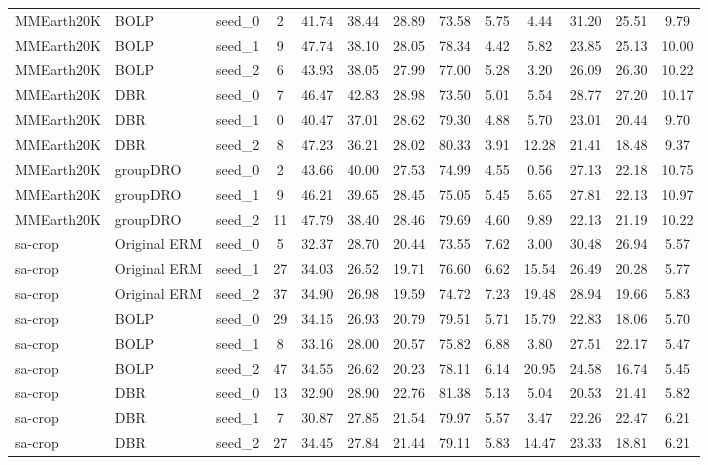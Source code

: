 \documentclass[11pt]{article}
\begin{document}
\begin{table}[h!]
{\begin{tabular}{lllcccccccccc}
MMEarth20K & BOLP & seed\_0 & 2 & 41.74 & 38.44 & 28.89 & 73.58 & 5.75 & 4.44 & 31.20 & 25.51 & 9.79 \\
MMEarth20K & BOLP & seed\_1 & 9 & 47.74 & 38.10 & 28.05 & 78.34 & 4.42 & 5.82 & 23.85 & 25.13 & 10.00 \\
MMEarth20K & BOLP & seed\_2 & 6 & 43.93 & 38.05 & 27.99 & 77.00 & 5.28 & 3.20 & 26.09 & 26.30 & 10.22 \\

MMEarth20K & DBR & seed\_0 & 7 & 46.47 & 42.83 & 28.98 & 73.50 & 5.01 & 5.54 & 28.77 & 27.20 & 10.17 \\
MMEarth20K & DBR & seed\_1 & 0 & 40.47 & 37.01 & 28.62 & 79.30 & 4.88 & 5.70 & 23.01 & 20.44 & 9.70 \\
MMEarth20K & DBR & seed\_2 & 8 & 47.23 & 36.21 & 28.02 & 80.33 & 3.91 & 12.28 & 21.41 & 18.48 & 9.37 \\

MMEarth20K & groupDRO & seed\_0 & 2 & 43.66 & 40.00 & 27.53 & 74.99 & 4.55 & 0.56 & 27.13 & 22.18 & 10.75 \\
MMEarth20K & groupDRO & seed\_1 & 9 & 46.21 & 39.65 & 28.45 & 75.05 & 5.45 & 5.65 & 27.81 & 22.13 & 10.97 \\
MMEarth20K & groupDRO & seed\_2 & 11 & 47.79 & 38.40 & 28.46 & 79.69 & 4.60 & 9.89 & 22.13 & 21.19 & 10.22 \\

\midrule

sa-crop & Original ERM & seed\_0 & 5 & 32.37 & 28.70 & 20.44 & 73.55 & 7.62 & 3.00 & 30.48 & 26.94 & 5.57 \\
sa-crop & Original ERM & seed\_1 & 27 & 34.03 & 26.52 & 19.71 & 76.60 & 6.62 & 15.54 & 26.49 & 20.28 & 5.77 \\
sa-crop & Original ERM & seed\_2 & 37 & 34.90 & 26.98 & 19.59 & 74.72 & 7.23 & 19.48 & 28.94 & 19.66 & 5.83 \\

sa-crop & BOLP & seed\_0 & 29 & 34.15 & 26.93 & 20.79 & 79.51 & 5.71 & 15.79 & 22.83 & 18.06 & 5.70 \\
sa-crop & BOLP & seed\_1 & 8 & 33.16 & 28.00 & 20.57 & 75.82 & 6.88 & 3.80 & 27.51 & 22.17 & 5.47 \\
sa-crop & BOLP & seed\_2 & 47 & 34.55 & 26.62 & 20.23 & 78.11 & 6.14 & 20.95 & 24.58 & 16.74 & 5.45 \\

sa-crop & DBR & seed\_0 & 13 & 32.90 & 28.90 & 22.76 & 81.38 & 5.13 & 5.04 & 20.53 & 21.41 & 5.82 \\
sa-crop & DBR & seed\_1 & 7 & 30.87 & 27.85 & 21.54 & 79.97 & 5.57 & 3.47 & 22.26 & 22.47 & 6.21 \\
sa-crop & DBR & seed\_2 & 27 & 34.45 & 27.84 & 21.44 & 79.11 & 5.83 & 14.47 & 23.33 & 18.81 & 6.21 \\


\end{tabular}}
\end{table}
\end{document}
